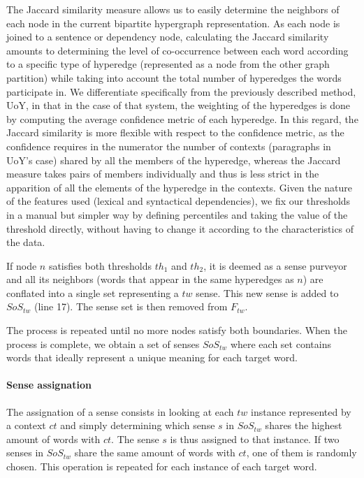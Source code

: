 The Jaccard similarity measure allows us to easily determine the neighbors of each node in the current bipartite hypergraph representation. As each node is joined to a sentence or dependency node, calculating the Jaccard similarity amounts to determining the level of co-occurrence between each word according to a specific type of hyperedge (represented as a node from the other graph partition) while taking into account the total number of hyperedges the words participate in. We differentiate specifically from the previously described method, UoY, in that in the case of that system, the weighting of the hyperedges is done by computing the average confidence metric of each hyperedge. In this regard, the Jaccard similarity is more flexible with respect to the confidence metric, as the confidence requires in the numerator the number of contexts (paragraphs in UoY's case) shared by all the members of the hyperedge, whereas the Jaccard measure takes pairs of members individually and thus is less strict in the apparition of all the elements of the hyperedge in the contexts. Given the nature of the features used (lexical and syntactical dependencies), we fix our thresholds in a manual but simpler way by defining percentiles and taking the value of the threshold directly, without having to change it according to the characteristics of the data.

If node $n$ satisfies both thresholds $th_1$ and $th_2$, it is deemed as a sense purveyor and all its neighbors (words that appear in the same hyperedges as $n$) are conflated into a single set representing a $tw$ sense. This new sense is added to $SoS_{tw}$ (line 17). The sense set is then removed from $F_{tw}$.

The process is repeated until no more nodes satisfy both boundaries. When the process is complete, we obtain a set of senses $SoS_{tw}$ where each set contains words that ideally represent a unique meaning for each target word. 

\paragraph{Sense assignation}

The assignation of a sense consists in looking at each $tw$ instance represented by a context $ct$ and simply determining which sense $s$ in $SoS_{tw}$ shares the highest amount of words with $ct$. The sense $s$ is thus assigned to that instance. If two senses in $SoS_{tw}$ share the same amount of words with $ct$, one of them is randomly chosen.  This operation is repeated for each instance of each target word. 



